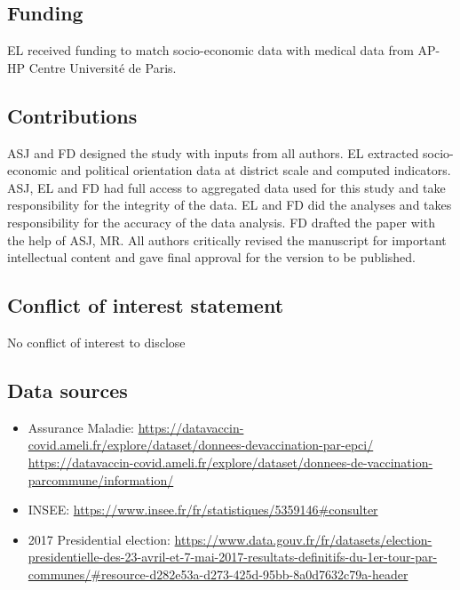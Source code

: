 \documentclass[
]{article}
\providecommand{\tightlist}{%
  \setlength{\itemsep}{0pt}\setlength{\parskip}{0pt}}
\begin{document}
\hypertarget{funding}{%
\subsection{Funding}\label{funding}}

EL received funding to match socio-economic data with medical data from AP-HP Centre Université de Paris.

\hypertarget{contributions}{%
\subsection{Contributions}\label{contributions}}

ASJ and FD designed the study with inputs from all authors. EL extracted socio-economic and political orientation data at district scale and computed indicators. ASJ, EL and FD had full access to aggregated data used for this study and take responsibility for the integrity of the data. EL and FD did the analyses and takes responsibility for the accuracy of the data analysis. FD drafted the paper with the help of ASJ, MR. All authors critically revised the manuscript for important intellectual content and gave final approval for the version to be published.

\hypertarget{conflict-of-interest-statement}{%
\subsection{Conflict of interest statement}\label{conflict-of-interest-statement}}

No conflict of interest to disclose

\hypertarget{data-sources}{%
\subsection{Data sources}\label{data-sources}}

\begin{itemize}
\tightlist
\item
  Assurance Maladie: \url{https://datavaccin-covid.ameli.fr/explore/dataset/donnees-devaccination-par-epci/} \url{https://datavaccin-covid.ameli.fr/explore/dataset/donnees-de-vaccination-parcommune/information/}
\item
  INSEE: \url{https://www.insee.fr/fr/statistiques/5359146\#consulter}
\item
  2017 Presidential election: \url{https://www.data.gouv.fr/fr/datasets/election-presidentielle-des-23-avril-et-7-mai-2017-resultats-definitifs-du-1er-tour-par-communes/\#resource-d282e53a-d273-425d-95bb-8a0d7632c79a-header}
\end{itemize}
\end{document}
